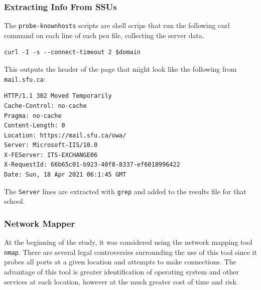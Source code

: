 \documentclass{article}
\theoremstyle{definition}
\begin{document}
\subsubsection{Extracting Info From SSUs}
The \texttt{probe-knownhosts} scripts are shell scrips
that run the following curl command on each line of each
psu file, collecting the server data.
\begin{lstlisting}
curl -I -s --connect-timeout 2 $domain
\end{lstlisting}
This outputs the header of the page that might look like the following from \texttt{mail.sfu.ca}:
\begin{lstlisting}
HTTP/1.1 302 Moved Temporarily
Cache-Control: no-cache
Pragma: no-cache
Content-Length: 0
Location: https://mail.sfu.ca/owa/
Server: Microsoft-IIS/10.0
X-FEServer: ITS-EXCHANGE06
X-RequestId: 66b65c01-b923-40f8-8337-ef6018996422
Date: Sun, 18 Apr 2021 06:1:45 GMT
\end{lstlisting}
The \texttt{Server} lines are extracted with \texttt{grep} and added to the results file for that school.

\subsubsection{Network Mapper}
At the beginning of the study, it was considered using the network mapping tool \texttt{nmap}.
There are several legal controversies surrounding the use of this tool since it probes all ports at
a given location and attempts to make connections. The advantage of this tool is greater identification
of operating system and other services at each location, however at the much greater cost of time and
risk.
\end{document}
